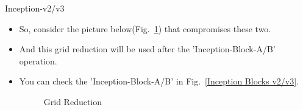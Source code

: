 \documentclass{beamer}
\begin{document}
	
\begin{frame}{Inception-v2/v3}
	\begin{itemize}
		\item So, consider the picture below(Fig.~\ref{poolinception2}) that compromises these two. 
		\item And this grid reduction will be used after the 'Inception-Block-A/B' operation.
		\item You can check the 'Inception-Block-A/B' in Fig.~\ref{Inception Blocks v2/v3}.
		\vspace{7pt}
		\begin{figure}[h]		
			\centering
			\quad
			\caption{Grid Reduction}
			\label{poolinception2}
		\end{figure}
	\end{itemize}
\end{frame}
\end{document}

